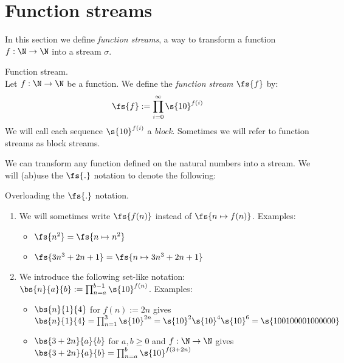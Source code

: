 \section{Function streams}
In this section we define \textit{function streams}, a way to transform a function $f: \N \to \N$ into a stream $\sigma$.

\begin{definition}{Function stream.}\label{def_function_stream}\\
	Let $f: \N \to \N$ be a function.
	We define the \textit{function stream} $\fs{f}$ by:
	\begin{align}
		\fs{f} := \prod_{i=0}^{\infty} \s{10}^{f(i)}
	\end{align}
	We will call each sequence $\s{10}^{f(i)}$ a \textit{block}. Sometimes we will refer to function streams as block streams.
\end{definition}

We can transform any function defined on the natural numbers into a stream. We will (ab)use the $\fs{.}$ notation to denote the following:

\begin{notation}{Overloading the $\fs{.}$ notation.}
	\begin{enumerate}
		\item We will sometimes write $\fs{f(n)}$ instead of $\fs{n \mapsto f(n)}$. Examples:
		\begin{itemize}
			\item $\fs{n^2} = \fs{n \mapsto n^2}$
			\item $\fs{3n^3+2n+1} = \fs{n \mapsto 3n^3+2n+1}$
		\end{itemize}
		\item We introduce the following set-like notation: $\bs{n}{a}{b} := \prod_{n=a}^{b-1}\s{10}^{f(n)}$. Examples:
		\begin{itemize}
			\item $\bs{n}{1}{4}$ for $f(n) := 2n$ gives $\bs{n}{1}{4} = \prod_{n=1}^{3}\s{10}^{2n} = \s{10}^{2}\s{10}^{4}\s{10}^{6}=\s{100100001000000}$
			\item $\bs{3+2n}{a}{b}$ for $a,b\geq0$ and $f : \N \to \N$ gives $\bs{3+2n}{a}{b} = \prod_{n=a}^{b} \s{10}^{f(3+2n)}$
		\end{itemize}
	\end{enumerate}
\end{notation}

